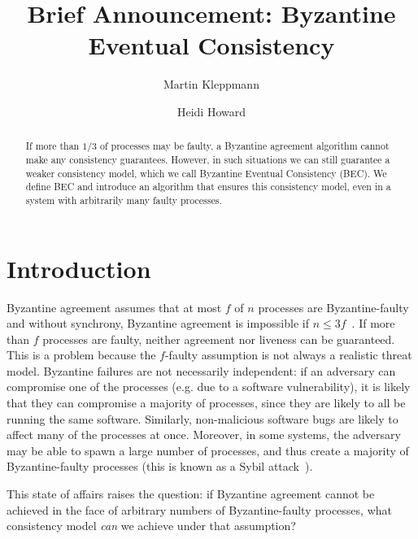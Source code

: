 \documentclass[manuscript,anonymous]{acmart}
\begin{document}
\title{Brief Announcement: Byzantine Eventual Consistency}
\author{Martin Kleppmann}

\author{Heidi Howard}

\begin{abstract}
    If more than $1/3$ of processes may be faulty, a Byzantine agreement algorithm cannot make any consistency guarantees.
    However, in such situations we can still guarantee a weaker consistency model, which we call Byzantine Eventual Consistency (BEC).
    We define BEC and introduce an algorithm that ensures this consistency model, even in a system with arbitrarily many faulty processes.
\end{abstract}
\maketitle

\section{Introduction}

Byzantine agreement assumes that at most $f$ of $n$ processes are Byzantine-faulty and without synchrony, Byzantine agreement is impossible if $n\leq3f$~\cite{Lamport:1982,Fischer:1985}.
If more than $f$ processes are faulty, neither agreement nor liveness can be guaranteed.
This is a problem because the $f$-faulty assumption is not always a realistic threat model.
Byzantine failures are not necessarily independent: if an adversary can compromise one of the processes (e.g. due to a software vulnerability), it is likely that they can compromise a majority of processes, since they are likely to all be running the same software. 
Similarly, non-malicious software bugs are likely to affect many of the processes at once.
Moreover, in some systems, the adversary may be able to spawn a large number of processes, and thus create a majority of Byzantine-faulty processes (this is known as a Sybil attack~\cite{Douceur:2002}).

This state of affairs raises the question: if Byzantine agreement cannot be achieved in the face of arbitrary numbers of Byzantine-faulty processes, what consistency model \emph{can} we achieve under that assumption?
\end{document}
